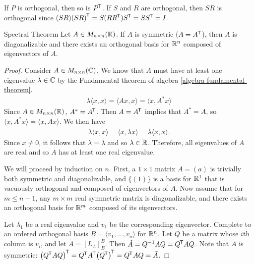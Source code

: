 \begin{rmk}
    If $P$ is orthogonal, then so is ${P}^{\mkern-1.5mu\mathsf{T}}$. If $S$ and $R$ are orthogonal, then $SR$ is orthogonal since $(SR){(SR)}^{\mkern-1.5mu\mathsf{T}} = S(R{R}^{\mkern-1.5mu\mathsf{T}}){S}^{\mkern-1.5mu\mathsf{T}} = S{S}^{\mkern-1.5mu\mathsf{T}} = I$.
\end{rmk}

\begin{thm}Spectral Theorem\label{spectral-theorem}\proofbreak
    Let $A \in M_{n \times n}(\mathbb{R})$. If $A$ is symmetric ($A = {A}^{\mkern-1.5mu\mathsf{T}}$), then $A$ is diagonalizable and there exists an orthogonal basis for $\mathbb{R}^n$ composed of eigenvectors of $A$.
\end{thm}

\begin{proof}
    Consider $A \in M_{n \times n}(\mathbb{C})$. We know that $A$ must have at least one eigenvalue $\lambda \in \mathbb{C}$ by the Fundamental theorem of algebra \ref{algebra-fundamental-theorem}.
    \begin{align*}
        \lambda\langle x, x\rangle = \langle Ax, x \rangle = \langle x, A^*x\rangle
    \end{align*}
    Since $A \in M_{n \times n}(\mathbb{R})$, $A^* = {A}^{\mkern-1.5mu\mathsf{T}}$. Then $A = {A}^{\mkern-1.5mu\mathsf{T}}$ implies that $A^* = A$, so $\langle x, A^*x \rangle = \langle x, Ax \rangle$. We then have
    \begin{align*}
        \lambda\langle x, x\rangle = \langle x, \lambda x\rangle = \overline{\lambda}\langle x, x \rangle.
    \end{align*}
    Since $x \neq 0$, it follows that $\lambda = \overline{\lambda}$ and so $\lambda \in \mathbb{R}$. Therefore, all eigenvalues of $A$ are real and so $A$ has at least one real eigenvalue.

    We will proceed by induction on $n$. First, a $1 \times 1$ matrix $A = (a)$ is trivially both symmetric and diagonalizable, and $\{(1)\}$ is a basis for $\mathbb{R}^1$ that is vacuously orthogonal and composed of eigenvectors of $A$. Now assume that for $m \leq n-1$, any $m \times m$ real symmetric matrix is diagonalizable, and there exists an orthogonal basis for $\mathbb{R}^m$ composed of its eigenvectors.
    
    Let $\lambda_1$ be a real eigenvalue and $v_1$ be the corresponding eigenvector. Complete to an ordered orthogonal basis $B = \langle v_1, \ldots, v_n \rangle$ for $\mathbb{R}^n$. Let $Q$ be a matrix whose $i$th column is $v_i$, and let
    $\tilde{A} = [L_A]_{B}^{B}$. Then $\tilde{A} = Q^{-1}AQ = {Q}^{\mkern-1.5mu\mathsf{T}}AQ$. Note that $\tilde{A}$ is symmetric: ${\left({Q}^{\mkern-1.5mu\mathsf{T}}AQ\right)}^{\mkern-1.5mu\mathsf{T}} = {Q}^{\mkern-1.5mu\mathsf{T}}{A}^{\mkern-1.5mu\mathsf{T}}{\left({Q}^{\mkern-1.5mu\mathsf{T}}\right)}^{\mkern-1.5mu\mathsf{T}} = {Q}^{\mkern-1.5mu\mathsf{T}}AQ = \tilde{A}$.


\end{proof}
